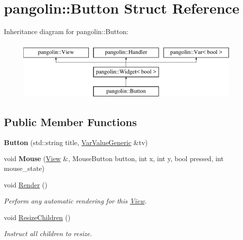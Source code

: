 \hypertarget{structpangolin_1_1_button}{}\section{pangolin\+:\+:Button Struct Reference}
\label{structpangolin_1_1_button}
Inheritance diagram for pangolin\+:\+:Button\+:\begin{figure}[H]
\begin{center}
\leavevmode
\includegraphics[height=3.000000cm]{structpangolin_1_1_button}
\end{center}
\end{figure}
\subsection*{Public Member Functions}
\begin{DoxyCompactItemize}
\item 
{\bfseries Button} (std\+::string title, \hyperlink{classpangolin_1_1_var_value_generic}{Var\+Value\+Generic} \&tv)\hypertarget{structpangolin_1_1_button_a6986974271cac97ef59d6287581fdbfc}{}\label{structpangolin_1_1_button_a6986974271cac97ef59d6287581fdbfc}

\item 
void {\bfseries Mouse} (\hyperlink{structpangolin_1_1_view}{View} \&, Mouse\+Button button, int x, int y, bool pressed, int mouse\+\_\+state)\hypertarget{structpangolin_1_1_button_a9ce3becafe18a9286c15f812473b23aa}{}\label{structpangolin_1_1_button_a9ce3becafe18a9286c15f812473b23aa}

\item 
void \hyperlink{structpangolin_1_1_button_a567d43e3b445ce6158c21a20c3751190}{Render} ()
\begin{DoxyCompactList}\small\item\em Perform any automatic rendering for this \hyperlink{structpangolin_1_1_view}{View}. \end{DoxyCompactList}\item 
void \hyperlink{structpangolin_1_1_button_a3477cc1ac51e4d0df131febb1341cfd3}{Resize\+Children} ()\hypertarget{structpangolin_1_1_button_a3477cc1ac51e4d0df131febb1341cfd3}{}\label{structpangolin_1_1_button_a3477cc1ac51e4d0df131febb1341cfd3}

\begin{DoxyCompactList}\small\item\em Instruct all children to resize. \end{DoxyCompactList}\end{DoxyCompactItemize}
